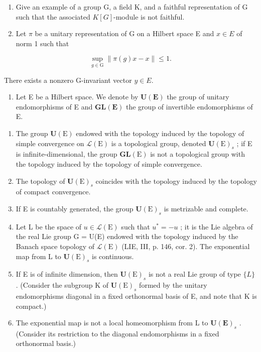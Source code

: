 \exercisesection{}

\begin{enumerate}
\def\labelenumi{\arabic{enumi})}
\item
  Give an example of a group G, a field K, and a faithful representation of G such that the associated \(K[G]\)-module is not faithful.
\item
  Let \(\pi\) be a unitary representation of G on a Hilbert space E and \(x \in E\) of norm 1 such that
\end{enumerate}

\[
\sup _ {g \in \mathrm{G}} \| \pi (g) x - x \| \leqslant 1.
\]

There exists a nonzero G-invariant vector \(y \in E\).

\begin{enumerate}
\def\labelenumi{\arabic{enumi})}
\setcounter{enumi}{2}
\tightlist
\item
  Let E be a Hilbert space. We denote by \(\mathbf{U}(\mathbf{E})\) the group of unitary endomorphisms of E and \(\mathbf{GL}(\mathbf{E})\) the group of invertible endomorphisms of E.
\end{enumerate}

\begin{enumerate}
\def\labelenumi{\alph{enumi})}
\item
  The group \(\mathbf{U}(\mathrm{E})\) endowed with the topology induced by the topology of simple convergence on \(\mathcal{L}(\mathrm{E})\) is a topological group, denoted \(\mathbf{U}(\mathrm{E})_{s}\) ; if E is infinite-dimensional, the group \(\mathbf{GL}(\mathrm{E})\) is not a topological group with the topology induced by the topology of simple convergence.
\item
  The topology of \(\mathbf{U}(\mathrm{E})_{s}\) coincides with the topology induced by the topology of compact convergence.
\item
  If E is countably generated, the group \(\mathbf{U}(\mathrm{E})_{s}\) is metrizable and complete.
\item
  Let L be the space of \(u \in \mathcal{L}(\mathrm{E})\) such that \(u^{*} = -u\) ; it is the Lie algebra of the real Lie group G = U(E) endowed with the topology induced by the Banach space topology of \(\mathcal{L}(\mathrm{E})\) (LIE, III, p. 146, cor. 2). The exponential map from L to \(\mathbf{U}(\mathrm{E})_s\) is continuous.
\item
  If E is of infinite dimension, then \(\mathbf{U}(\mathrm{E})_{s}\) is not a real Lie group of type \(\{L\}\) . (Consider the subgroup K of \(\mathbf{U}(\mathrm{E})_{s}\) formed by the unitary endomorphisms diagonal in a fixed orthonormal basis of E, and note that K is compact.)
\item
  The exponential map is not a local homeomorphism from L to \(\mathbf{U}(\mathbf{E})_{s}\) . (Consider its restriction to the diagonal endomorphisms in a fixed orthonormal basis.)
\end{enumerate}

